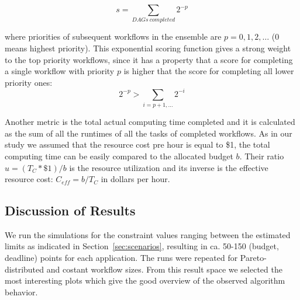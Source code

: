 \documentclass{sig-alternate}
\begin{document}
\begin{equation}
\label{eq:score}
s = \sum_{DAGs\ completed}2^{-p}
\end{equation}


where priorities of subsequent workflows in the ensemble are $p=0,1,2,\ldots$ (0
means highest priority). This exponential scoring function gives a strong weight
to the top priority workflows, since it has a property that a score for
completing a single workflow with priority $p$ is higher that the score for
completing all lower priority ones: 
\begin{equation}
\label{eq:score-property}
2^{-p} > \sum_{i=p+1,\ldots}2^{-i}
\end{equation}

Another metric is the total actual computing time completed and it is calculated
as the sum of all the runtimes of all the tasks of completed workflows. As in
our study we assumed that the resource cost pre hour is equal to \$1, the total
computing time can be easily compared to the allocated budget $b$. Their ratio
$u = (T_C * \$1)/b$ is the resource utilization and its inverse is the effective
resource cost: $C_{eff} = b/T_C$ in dollars per hour.

\subsection{Discussion of Results}




We run the simulations for the constraint values ranging between the
estimated limits as indicated in Section~\ref{sec:scenarios}, resulting in
ca. 50-150 (budget, deadline) points for each application. The runs were
repeated for Pareto-distributed and costant workflow sizes. From this result
space we selected the most interesting plots which give the good overview  of
the observed algorithm behavior.
\end{document}
